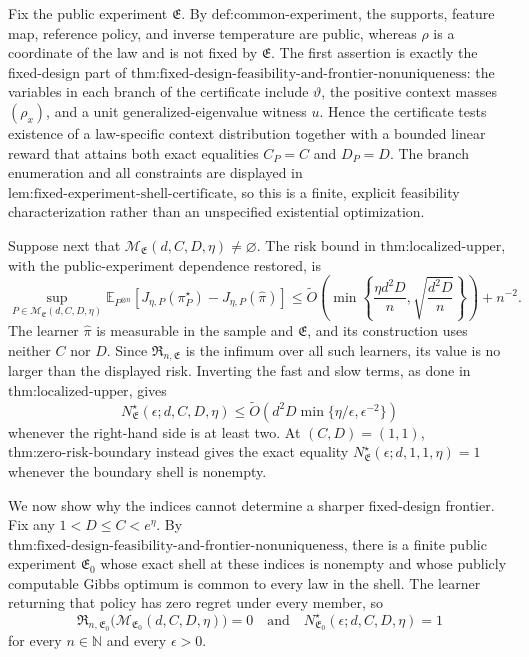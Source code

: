 Fix the public experiment \(\mathfrak E\). By \(\text{def:common-experiment}\), the supports, feature map, reference policy, and inverse temperature are public, whereas \(\rho\) is a coordinate of the law and is not fixed by \(\mathfrak E\). The first assertion is exactly the fixed-design part of \(\text{thm:fixed-design-feasibility-and-frontier-nonuniqueness}\): the variables in each branch of the certificate include \(\vartheta\), the positive context masses \((\rho_x)\), and a unit generalized-eigenvalue witness \(u\). Hence the certificate tests existence of a law-specific context distribution together with a bounded linear reward that attains both exact equalities \(C_P=C\) and \(D_P=D\). The branch enumeration and all constraints are displayed in \(\text{lem:fixed-experiment-shell-certificate}\), so this is a finite, explicit feasibility characterization rather than an unspecified existential optimization.

Suppose next that \(\mathcal M_{\mathfrak E}(d,C,D,\eta)\ne\varnothing\). The risk bound in \(\text{thm:localized-upper}\), with the public-experiment dependence restored, is
\[
\sup_{P\in\mathcal M_{\mathfrak E}(d,C,D,\eta)}
\mathbb E_{P^{\otimes n}}\!\left[J_{\eta,P}(\pi_P^\star)-J_{\eta,P}(\widehat\pi)\right]
\le
\widetilde O\!\left(\min\left\{\frac{\eta d^2D}{n},\sqrt{\frac{d^2D}{n}}\right\}\right)+n^{-2}.
\]
The learner \(\widehat\pi\) is measurable in the sample and \(\mathfrak E\), and its construction uses neither \(C\) nor \(D\). Since \(\mathfrak R_{n,\mathfrak E}\) is the infimum over all such learners, its value is no larger than the displayed risk. Inverting the fast and slow terms, as done in \(\text{thm:localized-upper}\), gives
\[
N^\star_{\mathfrak E}(\epsilon;d,C,D,\eta)
\le\widetilde O\!\left(d^2D\min\{\eta/\epsilon,\epsilon^{-2}\}\right)
\]
whenever the right-hand side is at least two. At \((C,D)=(1,1)\), \(\text{thm:zero-risk-boundary}\) instead gives the exact equality \(N^\star_{\mathfrak E}(\epsilon;d,1,1,\eta)=1\) whenever the boundary shell is nonempty.

We now show why the indices cannot determine a sharper fixed-design frontier. Fix any \(1<D\le C<e^\eta\). By \(\text{thm:fixed-design-feasibility-and-frontier-nonuniqueness}\), there is a finite public experiment \(\mathfrak E_0\) whose exact shell at these indices is nonempty and whose publicly computable Gibbs optimum is common to every law in the shell. The learner returning that policy has zero regret under every member, so
\[
\mathfrak R_{n,\mathfrak E_0}\bigl(\mathcal M_{\mathfrak E_0}(d,C,D,\eta)\bigr)=0
\quad\text{and}\quad
N^\star_{\mathfrak E_0}(\epsilon;d,C,D,\eta)=1
\]
for every \(n\in\mathbb N\) and every \(\epsilon>0\).

